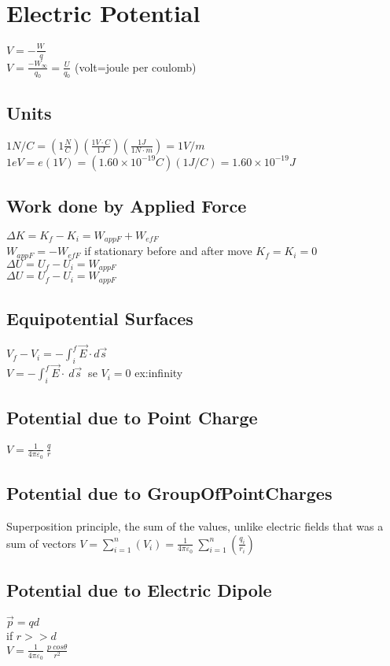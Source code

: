 \section*{Electric Potential}
$V=-\frac{W_{\:}}{q}$\\
$V=\frac{-W_{\infty }}{q_0}=\frac{U}{q_0}$ (volt=joule per coulomb)\\
\subsection*{Units}
$1N/C=\left(1\frac{N}{C}\right)\left(\frac{1V\cdot C}{1J}\right)\left(\frac{1J}{1N\cdot m}\right)=1V/m$\\
$1eV=e\left(1 V\right)=\left(1.60\times 10^{-19} C\right)\left(1 J/C\right)=1.60\times 10^{-19}J$\\
\subsection*{Work done by Applied Force}
$\Delta K=K_f-K_i=W_{appF}+W_{efF}$\\
$W_{appF}=-W_{efF}$ if stationary before and after move $K_f=K_i=0$\\
$\Delta U=U_f-U_i=W_{appF}$\\
$\Delta U=U_f-U_i=W_{appF}$\\
\subsection*{Equipotential Surfaces}
$V_f-V_i=-\int _i^f\vec{E}\cdot d\vec{s}\:$\\
$V=-\int _i^f\vec{E}\cdot \:d\vec{s}\:$ se $V_i = 0$ ex:infinity\\
\subsection*{Potential due to Point Charge}
$V=\frac{1}{4\pi \varepsilon _0}\:\frac{q}{r}$\\
\subsection*{Potential due to GroupOfPointCharges}
Superposition principle, the sum of the values, unlike electric fields that was a sum of vectors
$V=\sum _{i=1}^n\left(V_i\right)=\frac{1}{4\pi \varepsilon _0}\:\sum _{i=1}^n\left(\frac{q_i}{r_i}\right)$\\
\subsection*{Potential due to Electric Dipole}
$\vec{p}=qd$\\
if $r>>d$\\
$V=\frac{1}{4\pi \varepsilon _0}\:\frac{p\:cos\theta }{r^2}$\\
